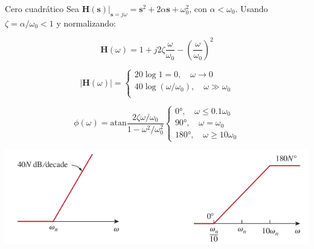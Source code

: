 \documentclass[xcolor={usenames,svgnames,dvipsnames}]{beamer}
\newcommand{\laplace}[1]{\mathbf{#1}(\mathbf{s})}
\newcommand{\slp}{\mathbf{s}}
\newcommand{\fasor}[1]{\mathbf{#1}(\omega)}
\newcommand{\atan}{\mathrm{atan}}
\begin{document}
\begin{frame}[label={sec:org2210e88}]{Cero cuadrático}
Sea \(\laplace{H}\rvert_{\slp = j\omega}  = \slp^2 + 2\alpha \slp + \omega_0^2\), con \(\alpha < \omega_0\). Usando \(\zeta = \alpha/\omega_0 < 1\) y normalizando:

\[
  \fasor{H} = 1 + j 2 \zeta \frac{\omega}{\omega_0} - \left(\frac{\omega}{\omega_0}\right)^2 
\]


\[
  |\fasor{H}| = 
  \begin{cases}
  20 \log 1 = 0, \quad \omega \to 0\\
  40 \log (\omega/\omega_0), \quad \omega \gg \omega_0\\
  \end{cases}
\]

\[
  \phi(\omega) = \atan \frac{2\zeta\omega/\omega_0}{1 - \omega^2/\omega_0^2}
  \begin{cases}
    \ang{0},\quad \omega \leq 0.1\omega_0\\
    \ang{90}, \quad \omega = \omega_0\\
    \ang{180}, \quad \omega \geq 10 \omega_0
  \end{cases}
\]


\begin{center}
\includegraphics[width=.9\linewidth]{figs/BodeCeroCuadratico.pdf}
\end{center}
\end{frame}
\end{document}
